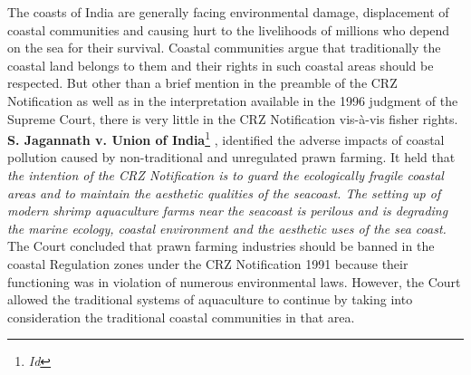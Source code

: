 \begin{multicols}{2}
\noi
The coasts of India are generally facing environmental damage, displacement of coastal
communities and causing hurt to the livelihoods of millions who depend on the sea for their
survival. Coastal communities argue that traditionally the coastal land belongs to them and
their rights in such coastal areas should be respected. But other than a brief mention in the
preamble of the CRZ Notification as well as in the interpretation available in the 1996
judgment of the Supreme Court, there is very little in the CRZ Notification vis-à-vis fisher
rights. \textbf{S. Jagannath v. Union of India}\footnote{\textit{Id}} , identified the adverse impacts of coastal
pollution caused by non-traditional and unregulated prawn farming. It held that \textit{the
intention of the CRZ Notification is to guard the ecologically fragile coastal areas and
to maintain the aesthetic qualities of the seacoast. The setting up of modern shrimp
aquaculture farms near the seacoast is perilous and is degrading the marine ecology,
coastal environment and the aesthetic uses of the sea coast.} The Court concluded that
prawn farming industries should be banned in the coastal Regulation zones under the
CRZ Notification 1991 because their functioning was in violation of numerous
environmental laws. However, the Court allowed the traditional systems of aquaculture
to continue by taking into consideration the traditional coastal communities in that area. 


\end{multicols}
